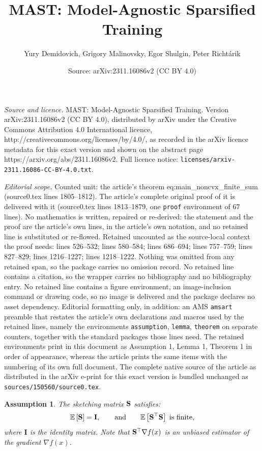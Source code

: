 \documentclass[10pt,a4paper]{amsart}
\title{MAST: Model-Agnostic Sparsified Training}
\author{Yury Demidovich, Grigory Malinovsky, Egor Shulgin, Peter Richt\'arik}
\date{Source: arXiv:2311.16086v2 (CC BY 4.0)}
\newtheorem{assumption}{Assumption}
\newcommand{\Exp}[1]{{\bb E}\left[#1\right]}
\newcommand{\bb}{\mathbb}
\newcommand{\mI}{\mathbf{I}}
\newcommand{\mS}{{\bf S}}
\begin{document}
\maketitle

\noindent\emph{Source and licence.} MAST: Model-Agnostic Sparsified Training. Version arXiv:2311.16086v2 (CC BY 4.0), distributed by arXiv under the Creative Commons Attribution 4.0 International licence, http://creativecommons.org/licenses/by/4.0/, as recorded in the arXiv licence metadata for this exact version and shown on the abstract page https://arxiv.org/abs/2311.16086v2. Full licence notice: \texttt{licenses/arxiv-2311.16086-CC-BY-4.0.txt}.\par\smallskip

\noindent\textit{Editorial scope.} Counted unit: the article's theorem eq:main\_noncvx\_finite\_sum (source0.tex lines 1805--1812). The article's complete original proof of it is delivered with it (source0.tex lines 1813--1879, one \texttt{proof} environment of 67 lines). No mathematics is written, repaired or re-derived: the statement and the proof are the article's own lines, in the article's own notation, and no retained line is substituted or re-flowed.  Retained uncounted as the source-local context the proof needs: lines 526--532; lines 580--584; lines 686--694; lines 757--759; lines 827--829; lines 1216--1227; lines 1218--1222.  Nothing was omitted from any retained span, so the package carries no omission record.  No retained line contains a citation, so the wrapper carries no bibliography and no bibliography entry.  No retained line contains a figure environment, an image-inclusion command or drawing code, so no image is delivered and the package declares no asset dependency.  Editorial formatting only, in addition: an AMS \texttt{amsart} preamble that restates the article's own declarations and macros used by the retained lines, namely the environments \texttt{assumption}, \texttt{lemma}, \texttt{theorem} on separate counters, together with the standard packages those lines need.  The retained environments print in this document as Assumption 1, Lemma 1, Theorem 1 in order of appearance, whereas the article prints the same items with the numbering of its own full document.  The complete native source of the article as distributed in the arXiv e-print for this exact version is bundled unchanged as \texttt{sources/150560/source0.tex}.
\begin{assumption} \label{ass:C}
	The sketching matrix $\mS$ satisfies:
	\begin{equation} \label{eq:sketch_def}
		\Exp{\mS } = \mI, \qquad \text{and} \qquad \Exp{\mS^\top \mS} \; \text{is finite},
	\end{equation}
	where $\mI$ is the identity matrix. Note that $\mS^\top \nabla f(x)$ is an unbiased estimator of the gradient $\nabla f(x)$.
\end{assumption}
\end{document}
